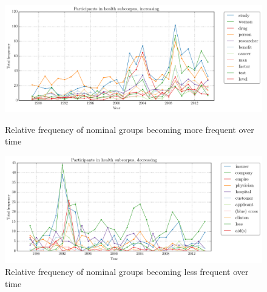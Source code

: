     \begin{figure}[htb!]
    \centering
    \begin{minipage}{.42\textwidth}
    \centering
    \includegraphics[width=1\textwidth]{../images/3.png}
    \caption{Relative frequency of nominal groups becoming more frequent over time}
    \label{fig:3}
    \end{minipage}%
    \begin{minipage}{.42\textwidth}
    \centering
    \includegraphics[width=1\textwidth]{../images/4.png}
    \caption{Relative frequency of nominal groups becoming less frequent over time}
    \label{fig:4}
    \end{minipage}
    \end{figure}


